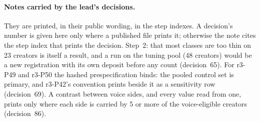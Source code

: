 \paragraph{Notes carried by the lead's decisions.} They are printed, in their public wording, in the step indexes. A
decision's number is given here only where a published file prints it; otherwise the note cites the step index that
prints the decision.
Step~2: that most classes are too thin on 23 creators is itself a result, and a run on the tuning pool (48 creators)
would be a new registration with its own deposit before any count (decision~65). For r3-P49 and r3-P50 the hashed
prespecification binds: the pooled control set is primary, and r3-P42's convention prints beside it as a sensitivity row
(decision~69). A contrast between voice sides, and every value read from one, prints only where each side is carried by
5 or more of the voice-eligible creators (decision~86).

